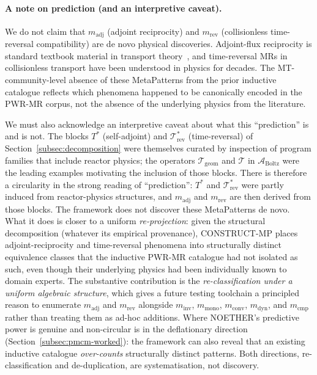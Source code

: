 \documentclass[manuscript]{acmart}
\begin{document}
\paragraph{A note on prediction (and an interpretive caveat).} We do not claim that $m_{\mathrm{adj}}$ (adjoint reciprocity) and $m_{\mathrm{rev}}$ (collisionless time-reversal compatibility) are de novo physical discoveries. Adjoint-flux reciprocity is standard textbook material in transport theory~\cite{BellGlasstone1970, LewisMiller1993}, and time-reversal MRs in collisionless transport have been understood in physics for decades. The MT-community-level absence of these MetaPatterns from the prior inductive catalogue reflects which phenomena happened to be canonically encoded in the PWR-MR corpus, not the absence of the underlying physics from the literature.

We must also acknowledge an interpretive caveat about what this ``prediction'' is and is not. The blocks $T^{*}$ (self-adjoint) and $\mathcal{T}^{*}_{\mathrm{rev}}$ (time-reversal) of Section~\ref{subsec:decomposition} were themselves curated by inspection of program families that include reactor physics; the operators $\mathcal{T}_{\mathrm{geom}}$ and $\mathcal{T}$ in $\mathcal{A}_{\mathrm{Boltz}}$ were the leading examples motivating the inclusion of those blocks. There is therefore a circularity in the strong reading of ``prediction'': $T^{*}$ and $\mathcal{T}^{*}_{\mathrm{rev}}$ were partly induced from reactor-physics structures, and $m_{\mathrm{adj}}$ and $m_{\mathrm{rev}}$ are then derived from those blocks. The framework does not discover these MetaPatterns de novo. What it does is closer to a uniform \emph{re-projection}: given the structural decomposition (whatever its empirical provenance), CONSTRUCT-MP places adjoint-reciprocity and time-reversal phenomena into structurally distinct equivalence classes that the inductive PWR-MR catalogue had not isolated as such, even though their underlying physics had been individually known to domain experts. The substantive contribution is the \emph{re-classification under a uniform algebraic structure}, which gives a future testing toolchain a principled reason to enumerate $m_{\mathrm{adj}}$ and $m_{\mathrm{rev}}$ alongside $m_{\mathrm{inv}}$, $m_{\mathrm{mono}}$, $m_{\mathrm{conv}}$, $m_{\mathrm{dyn}}$, and $m_{\mathrm{cmp}}$ rather than treating them as ad-hoc additions. Where NOETHER's predictive power is genuine and non-circular is in the deflationary direction (Section~\ref{subsec:pmcm-worked}): the framework can also reveal that an existing inductive catalogue \emph{over-counts} structurally distinct patterns. Both directions, re-classification and de-duplication, are systematisation, not discovery.
\end{document}
